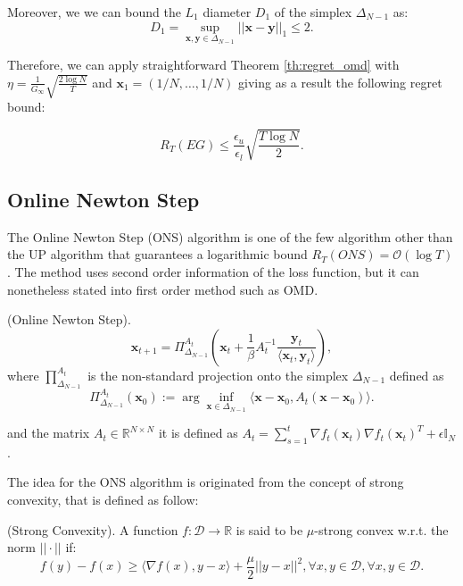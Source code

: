 Moreover, we we can bound the $L_1$ diameter $D_1$ of the simplex $\Delta_{N-1}$ as: 
$$D_1=\sup\limits_{\mathbf x,\mathbf y\in\Delta_{N-1}}||\mathbf x-\mathbf y||_1\le2.$$

Therefore, we can apply straightforward Theorem \ref{th:regret_omd} with $\eta=\frac{1}{G_\infty}\sqrt{\frac{2\log N}{T}}$ and $\mathbf x_1=(1/N,\ldots,1/N)$ giving as a result the following regret bound:

\begin{equation}
R_T(EG)\le \frac{\epsilon_u}{\epsilon_l}\sqrt{\frac{T\log N}{2}}.
\end{equation}


\subsection{Online Newton Step}

The Online Newton Step (ONS) \cite{hazan2007logarithmic} algorithm is one of the few algorithm other than the UP algorithm that guarantees a logarithmic bound $R_T(ONS)=\mathcal O(\log T)$. The method uses second order information of the loss function, but it can nonetheless stated into first order method such as OMD. 

\begin{definition}(Online Newton Step).
\begin{equation}\label{eq:update_ONS}
\mathbf x_{t+1}=\Pi^{A_t}_{\Delta_{N-1}}\left(\mathbf x_t+\frac{1}{\beta}A_t^{-1}\frac{\mathbf y_t}{\langle\mathbf x_t,\mathbf y_t\rangle}\right),
\end{equation}
where $\prod^{A_t}_{\Delta_{N-1}}$ is the non-standard projection onto the simplex $\Delta_{N-1}$ defined as 
$$\Pi^{A_t}_{\Delta_{N-1}}(\mathbf x_0):=\arg\inf\limits_{\mathbf x\in\Delta_{N-1}}\langle\mathbf x-\mathbf x_0,A_t(\mathbf x-\mathbf x_0)\rangle.$$

and the matrix $A_t\in\mathbb R^{N\times N}$ it is defined as $A_t=\sum\limits_{s=1}^t \nabla f_t(\mathbf x_t)\nabla f_t(\mathbf x_t)^T+\epsilon\mathbb I_N$.
\end{definition}

The idea for the ONS algorithm is originated from the concept of strong convexity, that is defined as follow:

\begin{definition}(Strong Convexity).\label{def:strong_cnvx}
A function $f:\mathcal D\to\mathbb R$ is said to be $\mu$-strong convex w.r.t. the norm $||\cdot||$ if: 
$$f(y)-f(x)\ge\langle\nabla f(x),y-x\rangle+\frac{\mu}{2}||y-x||^2,\forall x,y\in\mathcal D,\forall x,y\in\mathcal D.$$
\end{definition}

